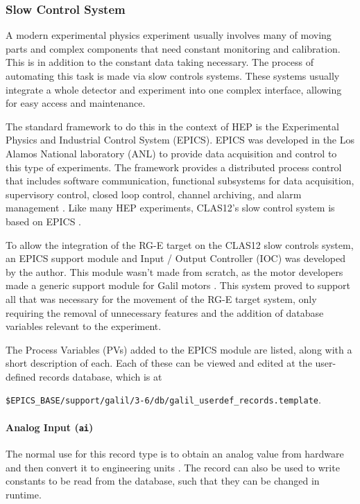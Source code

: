 \subsubsection{Slow Control System} \label{sssec::slowcontrolsystem}
    A modern experimental physics experiment usually involves many of moving parts and complex components that need constant monitoring and calibration.
    This is in addition to the constant data taking necessary.
    The process of automating this task is made via slow controls systems.
    These systems usually integrate a whole detector and experiment into one complex interface, allowing for easy access and maintenance.

    The standard framework to do this in the context of HEP is the Experimental Physics and Industrial Control System (EPICS).
    EPICS was developed in the Los Alamos National laboratory (ANL) to provide data acquisition and control to this type of experiments.
    The framework provides a distributed process control that includes software communication, functional subsystems for data acquisition, supervisory control, closed loop control, channel archiving, and alarm management \cite{dalesio1991}.
    Like many HEP experiments, CLAS12's slow control system is based on EPICS \cite{boyarinov2020}.

    To allow the integration of the RG-E target on the CLAS12 slow controls system, an EPICS support module and Input / Output Controller (IOC) was developed by the author.
    This module wasn't made from scratch, as the motor developers made a generic support module for Galil motors \cite{farnswort2009}.
    This system proved to support all that was necessary for the movement of the RG-E target system, only requiring the removal of unnecessary features and the addition of database variables relevant to the experiment.

    The Process Variables (PVs) added to the EPICS module are listed, along with a short description of each.
    Each of these can be viewed and edited at the user-defined records database, which is at

    \begin{center}
        \texttt{\$EPICS\_BASE/support/galil/3-6/db/galil\_userdef\_records.template}.
    \end{center}

    \paragraph{Analog Input (\texttt{ai})}
        The normal use for this record type is to obtain an analog value from hardware and then convert it to engineering units \cite{stanley1998}.
        The record can also be used to write constants to be read from the database, such that they can be changed in runtime.

